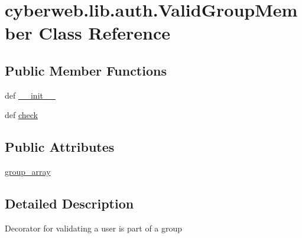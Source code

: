 \hypertarget{classcyberweb_1_1lib_1_1auth_1_1_valid_group_member}{\section{cyberweb.\-lib.\-auth.\-Valid\-Group\-Member \-Class \-Reference}
\label{classcyberweb_1_1lib_1_1auth_1_1_valid_group_member}
}
\subsection*{\-Public \-Member \-Functions}
\begin{DoxyCompactItemize}
\item 
def \hyperlink{classcyberweb_1_1lib_1_1auth_1_1_valid_group_member_ac84db0309e3303aef7dbc559e9cd1b42}{\-\_\-\-\_\-init\-\_\-\-\_\-}
\item 
def \hyperlink{classcyberweb_1_1lib_1_1auth_1_1_valid_group_member_ac610968f26351653b2f0760f6219518e}{check}
\end{DoxyCompactItemize}
\subsection*{\-Public \-Attributes}
\begin{DoxyCompactItemize}
\item 
\hyperlink{classcyberweb_1_1lib_1_1auth_1_1_valid_group_member_abbe25c3fee6f4413237f596c26d8a7f7}{group\-\_\-array}
\end{DoxyCompactItemize}


\subsection{\-Detailed \-Description}
\begin{DoxyVerb}
Decorator for validating a user is part of a group
\end{DoxyVerb}
 

